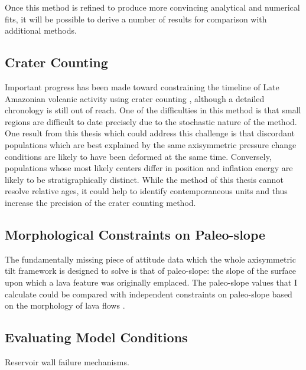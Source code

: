 Once this method is refined to produce more convincing analytical and numerical fits, it will be possible to derive a number of results for comparison with additional methods.

\subsection{Crater Counting}
Important progress has been made toward constraining the timeline of Late Amazonian volcanic activity using crater counting \parencite{kneissl_map-projection-independent_2011,robbins_volcanic_2011,
robbins_large_2013,
platz_crater-based_2013}, although a detailed chronology is still out of reach. One of the difficulties in this method is that small regions are difficult to date precisely due to the stochastic nature of the method. One result from this thesis which could address this challenge is that discordant populations which are best explained by the same axisymmetric pressure change conditions are likely to have been deformed at the same time. Conversely, populations whose most likely centers differ in position and inflation energy are likely to be stratigraphically distinct. While the method of this thesis cannot resolve relative ages, it could help to identify contemporaneous units and thus increase the precision of the crater counting method.

\subsection{Morphological Constraints on Paleo-slope}

The fundamentally missing piece of attitude data which the whole axisymmetric tilt framework is designed to solve is that of paleo-slope: the slope of the surface upon which a lava feature was originally emplaced. The paleo-slope values that I calculate could be compared with independent constraints on paleo-slope based on the morphology of lava flows \parencite{wadge_lobes_1991, peitersen_correlations_2000, peters_lava_2021}.

\subsection{Evaluating Model Conditions}

Reservoir wall failure mechanisms.



